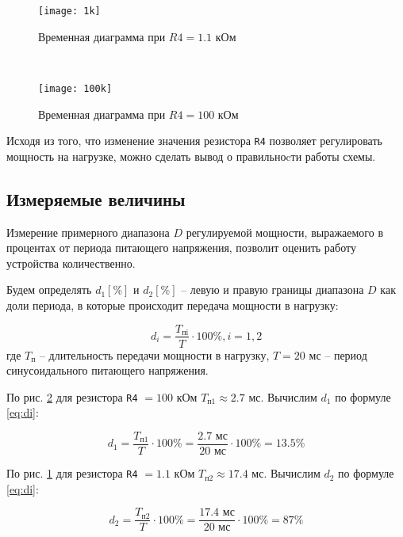\begin{figure}[H]
\begin{center}
	\texttt{[image: 1k]}
	\caption{Временная диаграмма при $R4 = 1.1$ кОм}
	\label{pic:diag:1k}
\end{center}
\end{figure}

~

\begin{figure}[H]
\begin{center}
	\texttt{[image: 100k]}
	\caption{Временная диаграмма при $R4 = 100$ кОм}
	\label{pic:diag:100k}
\end{center}
\end{figure}

Исходя из того, что изменение значения резистора \verb+R4+ позволяет регулировать мощность на нагрузке, можно сделать вывод о правильноcти работы схемы.

\subsection{Измеряемые величины}

Измерение примерного диапазона $D$ регулируемой мощности, выражаемого в процентах от периода питающего напряжения, позволит оценить работу устройства количественно.

Будем определять $d_1 [\%]$ и $d_2[\%]$ -- левую и правую границы диапазона $D$ как доли периода, в которые происходит передача мощности в нагрузку:

\begin{equation}
\label{eq:di}
	d_i = \frac{T_\text{пi}}{T} \cdot 100\%, i = 1,2
\end{equation}
\noindent где $T_\text{п}$ -- длительность передачи мощности в нагрузку, $T = 20$ мс -- период синусоидального питающего напряжения. 

По рис. \ref{pic:diag:100k} для резистора \verb+R4+ $=100$ кОм $T_\text{п1} \approx 2.7$ мс. Вычислим $d_1$ по формуле \ref{eq:di}:

\begin{displaymath}
	d_1 = \frac{T_\text{п1}}{T} \cdot 100\% = \frac{2.7 \text{ мс}}{20\text{ мс}} \cdot 100\% = 13.5 \%
\end{displaymath}

По рис. \ref{pic:diag:1k} для резистора \verb+R4+ $=1.1$ кОм $T_\text{п2} \approx 17.4$ мс. Вычислим $d_2$ по формуле \ref{eq:di}:

\begin{displaymath}
	d_2 = \frac{T_\text{п2}}{T} \cdot 100\% = \frac{17.4 \text{ мс}}{20\text{ мс}} \cdot 100\% = 87 \%
\end{displaymath}

